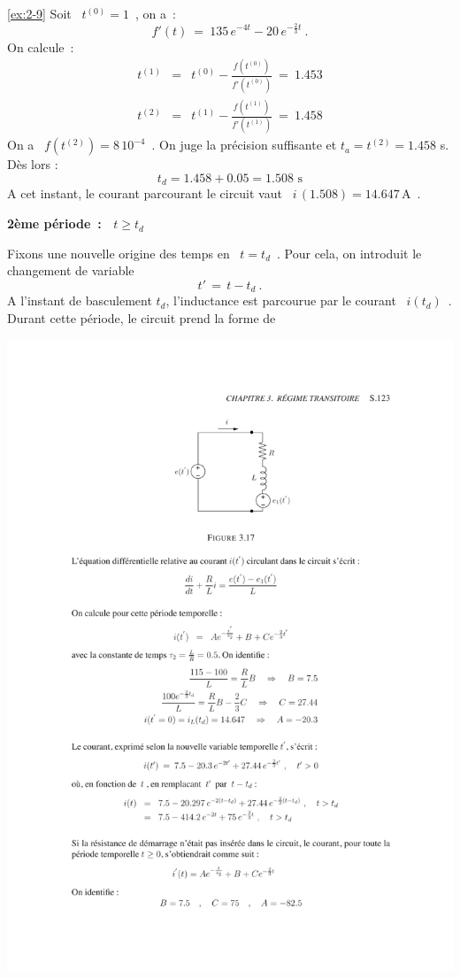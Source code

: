 \begin{solexercise}{\ref{ex:2-9}}
Soit \ $t^{(0)} = 1$~, on a~:
\[ f'(t) \: = \: 135\, e^{-4t} - 20 \, e^{-\frac{2}{3}t}~.\]
On calcule~:
\begin{eqnarray*}
	t^{(1)} &=& t^{(0)} - \frac{f(t^{(0)})}{f'(t^{(0)})} \: = \: 1.453\\
	t^{(2)} &=& t^{(1)} - \frac{f(t^{(1)})}{f'(t^{(1)})} \: = \: 1.458
\end{eqnarray*}
On a \ $f(t^{(2)}) = 8\, 10^{-4}$~. On juge la pr\'ecision suffisante et
$t_a = t^{(2)} = 1.458$ s. D\`es lors :
\[t_d=1.458+0.05=1.508\,\, \mbox{s}\]
A cet instant, le courant parcourant le circuit vaut \ $i\, (1.508) =
14.647\,$A~.

\vspace{\baselineskip}
{\bf 2\`eme p\'eriode~: \ $ t \geq  t_d$}

Fixons une nouvelle origine des temps en \ $t=t_d$~. Pour cela, on introduit le changement de variable
\[ t' \, = \, t - t_d~. \]
A l'instant de basculement $t_d$, l'inductance est parcourue par le courant \ $i(t_d)$~.
Durant cette p\'eriode, le circuit prend la forme de 
\begin{center}
	\includegraphics[width=\linewidth]{sol_exercices/ex3-9-3}
\end{center}



\end{solexercise}

